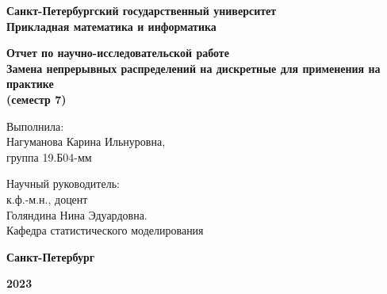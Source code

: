 
\begin{titlepage}
	\begin{center}
		
		\textbf{Санкт-Петербургский государственный университет\\Прикладная математика и информатика}
		
		\vspace{35mm}
	
		\textbf{\large  Отчет по научно-исследовательской работе } \\[8mm]
		\textbf{\large Замена непрерывных распределений на дискретные для применения на практике}\\ [8mm]
		\textbf{\large (семестр 7)}
		
		
		\vspace{20mm}

		\begin{flushright}
			{Выполнила:} \\
			Нагуманова Карина Ильнуровна, \\ группа 19.Б04-мм
		\end{flushright}
		\begin{flushright}
			{Научный руководитель:} \\
			к.ф.-м.н., доцент\\ Голяндина Нина Эдуардовна.\\ Кафедра статистического моделирования
		\end{flushright}
		
		\vfill 
		
		\textbf{Санкт-Петербург}
		\par{\textbf{2023}}
	\end{center}
\end{titlepage}

\restoregeometry
\addtocounter{page}{1}
